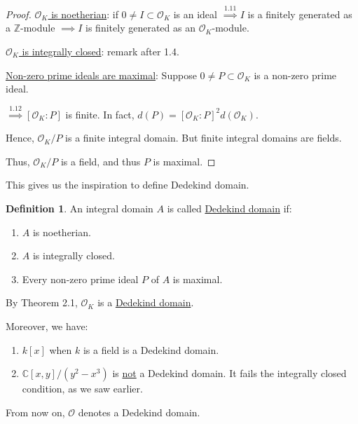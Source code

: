 \documentclass[openany]{amsbook}
\numberwithin{section}{chapter}
\theoremstyle{definition}
\newtheorem*{definition}{Definition}
\begin{document}
\begin{proof}
    \underline{\(\mathcal{O}_K\) is noetherian}: if \(0 \neq I \subset \mathcal{O}_K\) is an ideal \(\overset{1.11}{\implies} I\) is a finitely generated as a \(\mathbb{Z}\)-module \(\implies I\) is finitely generated as an \(\mathcal{O}_K\)-module.
    
    \underline{\(\mathcal{O}_K\) is integrally closed}: remark after 1.4.

    \underline{Non-zero prime ideals are maximal}: Suppose \(0 \neq P \subset \mathcal{O}_K\) is a non-zero prime ideal.
    
    \(\overset{1.12}{\implies} [\mathcal{O}_K : P]\) is finite. In fact, \(d(P) = [\mathcal{O}_K : P]^2 d(\mathcal{O}_K)\).
    
    Hence, \(\mathcal{O}_K / P\) is a finite integral domain. But finite integral domains are fields.

    Thus, \(\mathcal{O}_K / P\) is a field, and thus \(P\) is maximal.

\end{proof}

This gives us the inspiration to define Dedekind domain.

\begin{definition}
    An integral domain \(A\) is called \underline{Dedekind domain} if:

    \begin{enumerate}[label=\arabic*)]
        \item \(A\) is noetherian.
        \item \(A\) is integrally closed.
        \item Every non-zero prime ideal \(P\) of \(A\) is maximal. 
    \end{enumerate} 
\end{definition}

By Theorem 2.1, \(\mathcal{O}_K\) is a \underline{Dedekind domain}.

Moreover, we have:

\begin{enumerate}[label=\arabic*)]
    \item \(k[x]\) when \(k\) is a field is a Dedekind domain.
    \item \(\mathbb{C}[x,y] / (y^2 - x^3)\) is \underline{not} a Dedekind domain. It fails the integrally closed condition, as we saw earlier. 
\end{enumerate} 

From now on, \(\mathcal{O}\) denotes a Dedekind domain.
\end{document}
